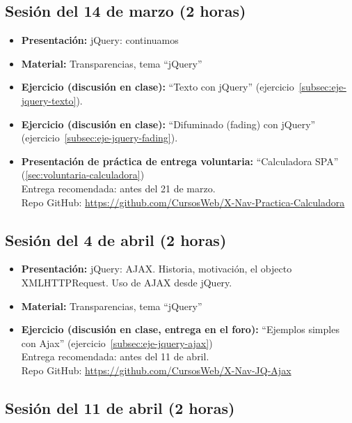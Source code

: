 \documentclass[a4paper,12pt]{report}
\begin{document}
\subsection{Sesión del 14 de marzo (2 horas)}

\begin{itemize}
\item \textbf{Presentación:} jQuery: continuamos
\item \textbf{Material:} Transparencias, tema ``jQuery''
\item \textbf{Ejercicio (discusión en clase):} ``Texto con jQuery'' (ejercicio~\ref{subsec:eje-jquery-texto}).
\item \textbf{Ejercicio (discusión en clase):} ``Difuminado (fading) con jQuery'' (ejercicio~\ref{subsec:eje-jquery-fading}).
\item \textbf{Presentación de práctica de entrega voluntaria:} ``Calculadora SPA'' (\ref{sec:voluntaria-calculadora}) \\
  Entrega recomendada: antes del 21 de marzo. \\
  Repo GitHub: \url{https://github.com/CursosWeb/X-Nav-Practica-Calculadora} \\
\end{itemize}


\subsection{Sesión del 4 de abril (2 horas)}

\begin{itemize}
\item \textbf{Presentación:} jQuery: AJAX. Historia, motivación, el objecto XMLHTTPRequest. Uso de AJAX desde jQuery.
\item \textbf{Material:} Transparencias, tema ``jQuery''
\item \textbf{Ejercicio (discusión en clase, entrega en el foro):} ``Ejemplos simples con Ajax'' (ejercicio~\ref{subsec:eje-jquery-ajax}) \\
  Entrega recomendada: antes del 11 de abril. \\
  Repo GitHub: \url{https://github.com/CursosWeb/X-Nav-JQ-Ajax}
\end{itemize}

\subsection{Sesión del 11 de abril (2 horas)}
\end{document}
